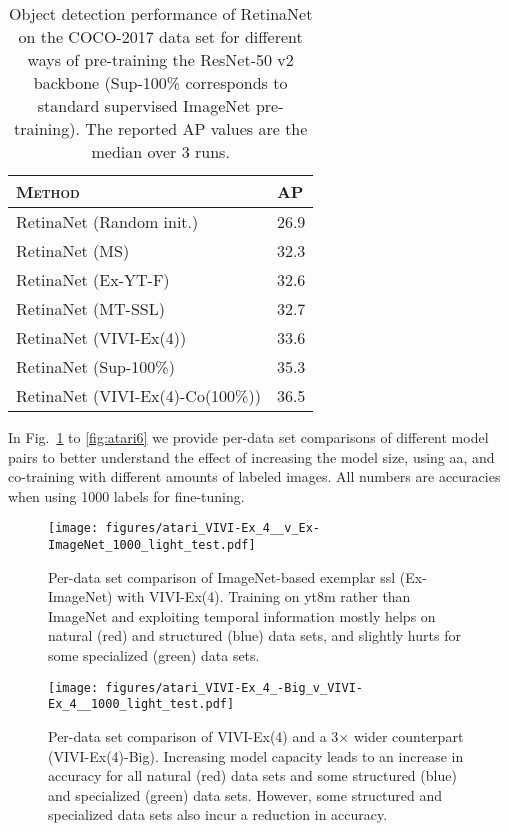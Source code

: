 \documentclass[10pt,twocolumn,letterpaper]{article}
\renewcommand{\paragraph}[1]{\noindent{\bf #1}\quad}
\begin{document}
\begin{table}[h!]
    \centering
    \small
\begin{tabular}{ll}
\toprule
\textsc{Method} & \textsc{AP} \\
\midrule
RetinaNet (Random init.) & 26.9 \\
RetinaNet (MS) & 32.3 \\
RetinaNet (Ex-YT-F) & 32.6 \\
RetinaNet (MT-SSL) & 32.7 \\
RetinaNet (VIVI-Ex(4)) & 33.6 \\
RetinaNet (Sup-100\%) & 35.3 \\
RetinaNet (VIVI-Ex(4)-Co(100\%)) & 36.5 \\
\bottomrule
\end{tabular}     \caption{Object detection performance of RetinaNet \cite{lin2017focal} on the COCO-2017 data set \cite{lin2014microsoft} for different ways of pre-training the ResNet-50 v2 backbone (Sup-100\% corresponds to standard supervised ImageNet pre-training). The reported AP values are the median over 3 runs.}
    \label{tab:coco-detection}
\end{table}




\paragraph{Additional figures} In Fig.~\ref{fig:atari2} to \ref{fig:atari6} we provide per-data set comparisons of different model pairs to better understand the effect of increasing the model size, using \gls{aa}, and co-training with different amounts of labeled images. All numbers are accuracies when using 1000 labels for fine-tuning.

\FloatBarrier

\begin{figure}[h]
\centering
\texttt{[image: figures/atari\_VIVI-Ex\_4\_\_v\_Ex-ImageNet\_1000\_light\_test.pdf]}
\caption{Per-data set comparison of ImageNet-based exemplar \gls{ssl} (Ex-ImageNet) with VIVI-Ex(4). Training on \gls{yt8m} rather than ImageNet and exploiting temporal information mostly helps on natural (red) and structured (blue) data sets, and slightly hurts for some specialized (green) data sets.}
\label{fig:atari2}
\end{figure}

\begin{figure}[h]
\centering
\texttt{[image: figures/atari\_VIVI-Ex\_4\_-Big\_v\_VIVI-Ex\_4\_\_1000\_light\_test.pdf]}
\caption{Per-data set comparison of VIVI-Ex(4) and a 3$\times$ wider counterpart (VIVI-Ex(4)-Big). Increasing model capacity leads to an increase in accuracy for all natural (red) data sets and some structured (blue) and specialized (green) data sets. However, some structured and specialized data sets also incur a reduction in accuracy.}
\label{fig:atari3}
\end{figure}
\end{document}

